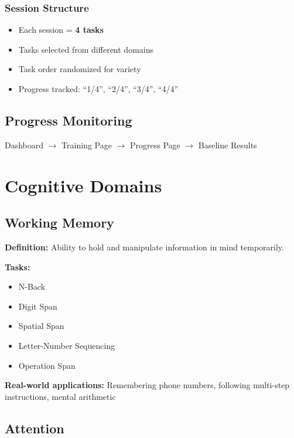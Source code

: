 \documentclass[12pt,a4paper]{article}
\begin{document}
\subsubsection{Session Structure}
\begin{itemize}
    \item Each session = \textbf{4 tasks}
    \item Tasks selected from different domains
    \item Task order randomized for variety
    \item Progress tracked: ``1/4'', ``2/4'', ``3/4'', ``4/4''
\end{itemize}

\subsection{Progress Monitoring}

\begin{center}
Dashboard $\rightarrow$ Training Page $\rightarrow$ Progress Page $\rightarrow$ Baseline Results
\end{center}

\section{Cognitive Domains}

\subsection{Working Memory}

\textbf{Definition:} Ability to hold and manipulate information in mind temporarily.

\textbf{Tasks:}
\begin{itemize}
    \item N-Back
    \item Digit Span
    \item Spatial Span
    \item Letter-Number Sequencing
    \item Operation Span
\end{itemize}

\textbf{Real-world applications:} Remembering phone numbers, following multi-step instructions, mental arithmetic

\subsection{Attention}
\end{document}
